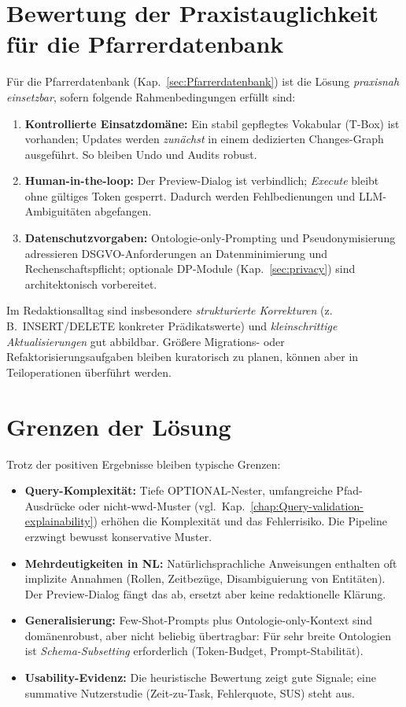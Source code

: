 \section{Bewertung der Praxistauglichkeit für die Pfarrerdatenbank}
Für die Pfarrerdatenbank (Kap.~\ref{sec:Pfarrerdatenbank}) ist die Lösung \emph{praxisnah einsetzbar}, sofern folgende Rahmenbedingungen erfüllt sind:
\begin{enumerate}
  \item \textbf{Kontrollierte Einsatzdomäne:} Ein stabil gepflegtes Vokabular (T-Box) ist vorhanden; Updates werden \emph{zunächst} in einem dedizierten Changes-Graph ausgeführt. So bleiben Undo und Audits robust.
  \item \textbf{Human-in-the-loop:} Der Preview-Dialog ist verbindlich; \emph{Execute} bleibt ohne gültiges Token gesperrt. Dadurch werden Fehlbedienungen und LLM-Ambiguitäten abgefangen.
  \item \textbf{Datenschutzvorgaben:} Ontologie-only-Prompting und Pseudonymisierung adressieren DSGVO-Anforderungen an Datenminimierung und Rechenschaftspflicht; optionale DP-Module (Kap.~\ref{sec:privacy}) sind architektonisch vorbereitet.
\end{enumerate}
Im Redaktionsalltag sind insbesondere \emph{strukturierte Korrekturen} (z.\,B.\ INSERT/DELETE konkreter Prädikatswerte) und \emph{kleinschrittige Aktualisierungen} gut abbildbar. Größere Migrations- oder Refaktorisierungsaufgaben bleiben kuratorisch zu planen, können aber in Teiloperationen überführt werden.

\section{Grenzen der Lösung}
Trotz der positiven Ergebnisse bleiben typische Grenzen:
\begin{itemize}
  \item \textbf{Query-Komplexität:} Tiefe OPTIONAL-Nester, umfangreiche Pfad-Ausdrücke oder nicht-wwd-Muster (vgl.\ Kap.~\ref{chap:Query-validation-explainability}) erhöhen die Komplexität und das Fehlerrisiko. Die Pipeline erzwingt bewusst konservative Muster.
  \item \textbf{Mehrdeutigkeiten in NL:} Natürlichsprachliche Anweisungen enthalten oft implizite Annahmen (Rollen, Zeitbezüge, Disambiguierung von Entitäten). Der Preview-Dialog fängt das ab, ersetzt aber keine redaktionelle Klärung.
  \item \textbf{Generalisierung:} Few-Shot-Prompts plus Ontologie-only-Kontext sind domänenrobust, aber nicht beliebig übertragbar: Für sehr breite Ontologien ist \emph{Schema-Subsetting} erforderlich (Token-Budget, Prompt-Stabilität).
  \item \textbf{Usability-Evidenz:} Die heuristische Bewertung zeigt gute Signale; eine summative Nutzerstudie (Zeit-zu-Task, Fehlerquote, SUS) steht aus.
\end{itemize}

